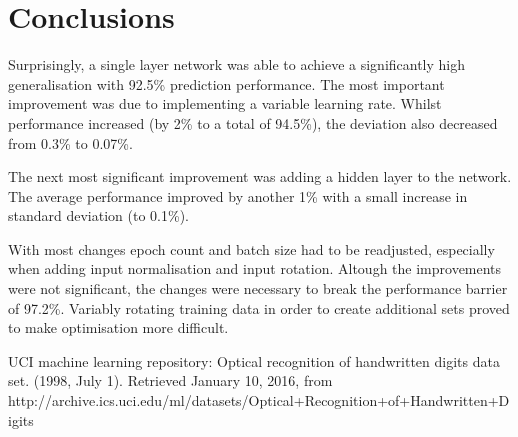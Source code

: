 \documentclass[11]{article}
\begin{document}
\section{Conclusions}
Surprisingly, a single layer network was able to achieve a significantly high generalisation with  92.5\% prediction performance. The most important improvement was due to implementing a variable learning rate. Whilst performance increased (by 2\% to a total of 94.5\%), the deviation also decreased from 0.3\% to 0.07\%.

The next most significant improvement was adding a hidden layer to the network. The average performance improved by another 1\% with a small increase in standard deviation (to 0.1\%).

With most changes epoch count and batch size had to be readjusted, especially when adding input normalisation and input rotation. Altough the improvements were not significant, the changes were necessary to break the performance barrier of 97.2\%. Variably rotating training data in order to create additional sets proved to make optimisation more difficult. 

\begin{thebibliography}{9}
UCI machine learning repository: Optical recognition of handwritten digits data set. (1998, July 1). Retrieved January 10, 2016, from http://archive.ics.uci.edu/ml/datasets/Optical+Recognition+of+Handwritten+Digits

\end{thebibliography}
\end{document}
